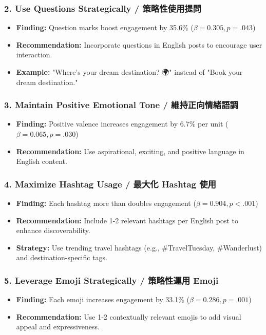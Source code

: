 \documentclass[12pt,a4paper]{article}
\begin{document}
\subsubsection{2. Use Questions Strategically / 策略性使用提問}
\begin{itemize}
    \item \textbf{Finding:} Question marks boost engagement by 35.6\% ($\beta = 0.305, p = .043$)
    \item \textbf{Recommendation:} Incorporate questions in English posts to encourage user interaction.
    \item \textbf{Example:} "Where's your dream destination? 🌍" instead of "Book your dream destination."
\end{itemize}

\subsubsection{3. Maintain Positive Emotional Tone / 維持正向情緒語調}
\begin{itemize}
    \item \textbf{Finding:} Positive valence increases engagement by 6.7\% per unit ($\beta = 0.065, p = .030$)
    \item \textbf{Recommendation:} Use aspirational, exciting, and positive language in English content.
\end{itemize}

\subsubsection{4. Maximize Hashtag Usage / 最大化 Hashtag 使用}
\begin{itemize}
    \item \textbf{Finding:} Each hashtag more than doubles engagement ($\beta = 0.904, p < .001$)
    \item \textbf{Recommendation:} Include 1-2 relevant hashtags per English post to enhance discoverability.
    \item \textbf{Strategy:} Use trending travel hashtags (e.g., \#TravelTuesday, \#Wanderlust) and destination-specific tags.
\end{itemize}

\subsubsection{5. Leverage Emoji Strategically / 策略性運用 Emoji}
\begin{itemize}
    \item \textbf{Finding:} Each emoji increases engagement by 33.1\% ($\beta = 0.286, p = .001$)
    \item \textbf{Recommendation:} Use 1-2 contextually relevant emojis to add visual appeal and expressiveness.
\end{itemize}
\end{document}
